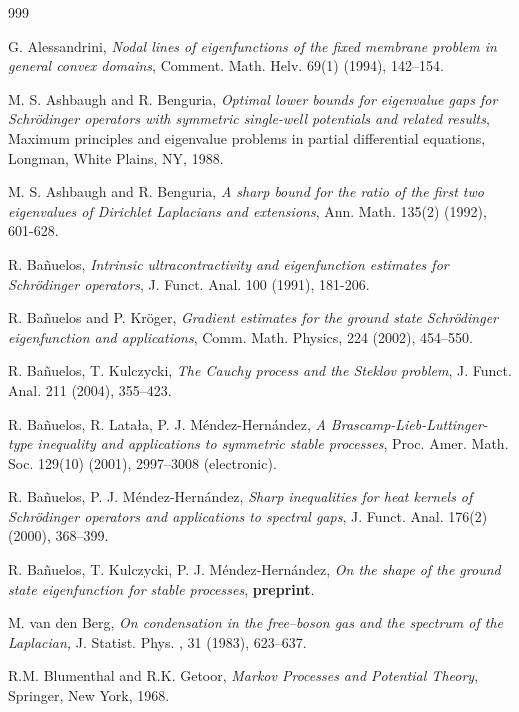 \documentclass[11pt,leqno]{article}
\theoremstyle{definition}
\numberwithin{equation}{section}
\begin{document}
\begin{thebibliography}{999}


G{.}
Alessandrini,
\emph{Nodal lines of eigenfunctions of the fixed
membrane problem in general
convex domains},
Comment{.} Math{.}
Helv{.} 69(1) (1994), 142--154.

 M. S. Ashbaugh and R. Benguria, 
\emph{Optimal lower bounds for eigenvalue gaps for Schr{\"o}dinger
  operators with symmetric single-well potentials and related
  results}, Maximum principles and eigenvalue problems in partial
differential equations, Longman, White Plains, NY, 1988.

 M. S. Ashbaugh and R. Benguria,
\emph{A sharp bound for the ratio of the first two eigenvalues of
  Dirichlet Laplacians and extensions}, Ann{.} Math{.} 135(2) (1992), 601-628.

 R. Ba\~nuelos,
\emph{Intrinsic ultracontractivity and eigenfunction estimates for
  Schr{\"o}dinger operators}, J. Funct. Anal. 100 (1991), 181-206.

  R. Ba\~nuelos and P. Kr\"oger, \emph{Gradient estimates for the ground state 
Schr\"odinger eigenfunction and applications}, Comm. Math. Physics, 224 (2002), 454--550.

R. Ba\~nuelos, T. Kulczycki,
\emph{The Cauchy process and the Steklov problem},
J. Funct. Anal. 211 (2004), 355--423.


R{.} Ba\~nuelos,
R{.} Lata\l{}a, P{.} J{.} M\'endez-Hern\'andez,
\emph{A
Brascamp-Lieb-Luttinger-type
inequality and applications to symmetric
stable processes},
Proc{.} Amer{.} Math{.} Soc{.} 129(10) (2001),
2997--3008 (electronic).

R{.} Ba\~nuelos, P{.} J{.} M\'endez-Hern\'andez,
\emph{Sharp inequalities for heat kernels of
Schr{\"o}dinger operators and
applications to spectral gaps},
J{.}
Funct{.} Anal{.} 176(2) (2000), 368--399.

R{.} Ba\~nuelos, T{.} Kulczycki, P{.} J{.} M\'endez-Hern\'andez,
\emph{On the shape of the ground state eigenfunction for stable
processes}, {\bf preprint}.  


 M{.} van den Berg,  \emph{On condensation in the free--boson
gas and the spectrum of the Laplacian,}  J. Statist. Phys. , 31
(1983), 623--637.

R{.}M{.} Blumenthal and
R{.}K{.} Getoor, \emph{Markov Processes and
Potential
Theory},
Springer, New York,
1968.



\end{thebibliography}
\end{document}
